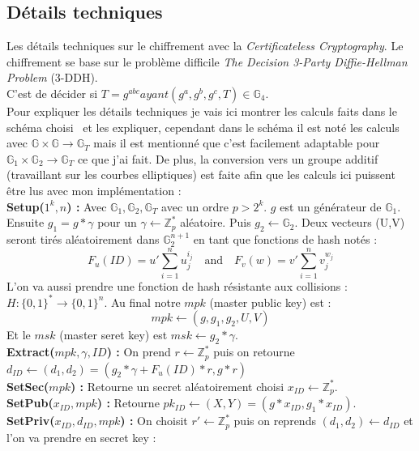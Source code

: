 \subsection{Détails techniques}
Les détails techniques sur le chiffrement avec la \textit{Certificateless Cryptography}.
Le chiffrement se base sur le problème difficile \textit{The Decision 3-Party Diffie-Hellman Problem} (3-DDH). \\C'est de décider si $T =g^{abc} ayant (g^a, g^b, g^c, T) \in \mathbb{G}_4$.\\
Pour expliquer les détails techniques je vais ici montrer les calculs faits dans le schéma choisi~\cite{DBLP:conf/pkc/DentLP08} et les expliquer, cependant dans le schéma il est noté les calculs avec $\mathbb{G} \times \mathbb{G} \rightarrow \mathbb{G}_T$ mais il est mentionné que c'est facilement adaptable pour $\mathbb{G}_1 \times \mathbb{G}_2 \rightarrow \mathbb{G}_T$ ce que j'ai fait. De plus, la conversion vers un groupe additif (travaillant sur les courbes elliptiques) est faite afin que les calculs ici puissent être lus avec mon implémentation :\\
\textbf{Setup($1^k, n$) :} Avec $\mathbb{G}_1, \mathbb{G}_2, \mathbb{G}_T$ avec un ordre $p > 2^k$. $g$ est un générateur de $\mathbb{G}_1$. Ensuite  $g_1 = g * \gamma$ pour un $\gamma \leftarrow  \mathbb{Z}_p^*$ aléatoire. Puis $g_2 \leftarrow \mathbb{G}_2$. Deux vecteurs (U,V) seront tirés aléatoirement dans $\mathbb{G}_2^{n+1}$ en tant que fonctions de hash notés :
\[F_u(ID) = u' \sum_{i=1}^{n} u_j^{i_j}\quad\mathrm{and}\quad F_v(w) = v' \sum_{i=1}^{n} v_j^{w_j}\]
L'on va aussi prendre une fonction de hash résistante aux collisions : $H : \{0,1\}^* \rightarrow \{0,1\}^n$. Au final notre $mpk$ (master public key) est :
\[mpk \leftarrow (g, g_1, g_2, U, V)\]
Et le $msk$ (master seret key) est $msk \leftarrow g_2*\gamma$.\\
\textbf{Extract($mpk, \gamma, ID$) :} On prend $r \leftarrow \mathbb{Z}_p^*$ puis on retourne $d_{ID} \leftarrow (d_1, d_2) = (g_2*\gamma + F_u(ID)*r, g*r)$\\
\textbf{SetSec($mpk$) :} Retourne un secret aléatoirement choisi $x_{ID} \leftarrow \mathbb{Z}_p^*$.\\
\textbf{SetPub($x_{ID}, mpk$) :} Retourne $pk_{ID} \leftarrow (X,Y) = (g*x_{ID}, g_1*x_{ID})$.\\
\textbf{SetPriv($x_{ID}, d_{ID}, mpk$) :} On choisit $r' \leftarrow \mathbb{Z}_p^*$ puis on reprends $(d_1, d_2) \leftarrow d_{ID}$ et l'on va prendre en secret key : 
